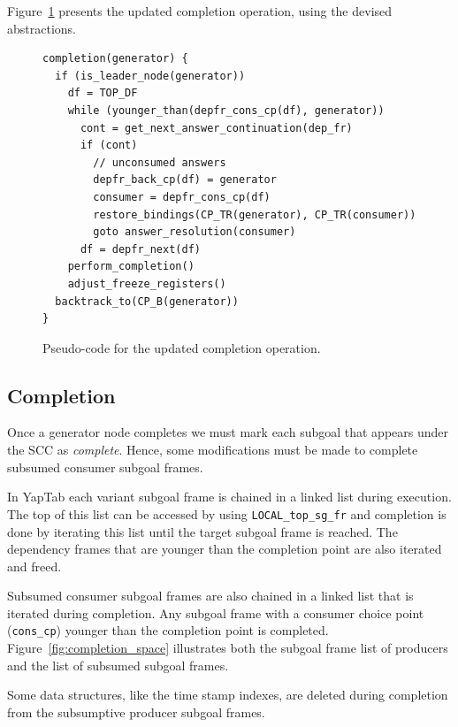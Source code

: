 Figure~\ref{fig:completion_operation} presents the updated completion operation,
using the devised abstractions.

\begin{figure}[ht]
\begin{Verbatim}
completion(generator) {
  if (is_leader_node(generator))
    df = TOP_DF
    while (younger_than(depfr_cons_cp(df), generator))
      cont = get_next_answer_continuation(dep_fr)
      if (cont)
        // unconsumed answers
        depfr_back_cp(df) = generator
        consumer = depfr_cons_cp(df)
        restore_bindings(CP_TR(generator), CP_TR(consumer))
        goto answer_resolution(consumer)
      df = depfr_next(df)
    perform_completion()
    adjust_freeze_registers()
  backtrack_to(CP_B(generator))
}
\end{Verbatim}
\caption{Pseudo-code for the updated completion operation.}
\label{fig:completion_operation}
\end{figure}

\subsection{Completion}

Once a generator node completes we must mark each subgoal that appears under the SCC as \textit{complete}.
Hence, some modifications must be made to complete subsumed consumer subgoal frames.

In YapTab each variant subgoal frame is chained in a linked list during execution. The top of this list
can be accessed by using \texttt{LOCAL\_top\_sg\_fr} and completion is done by iterating this list until
the target subgoal frame is reached. The dependency frames that are younger than the completion point
are also iterated and freed. 

Subsumed consumer subgoal frames are also chained in a linked list
that is iterated during completion. Any subgoal frame with a consumer choice point (\texttt{cons\_cp})
younger than the completion point is completed. Figure~\ref{fig:completion_space} illustrates both the
subgoal frame list of producers and the list of subsumed subgoal frames.

Some data structures, like the time stamp indexes, are deleted during completion from the
subsumptive producer subgoal frames.

